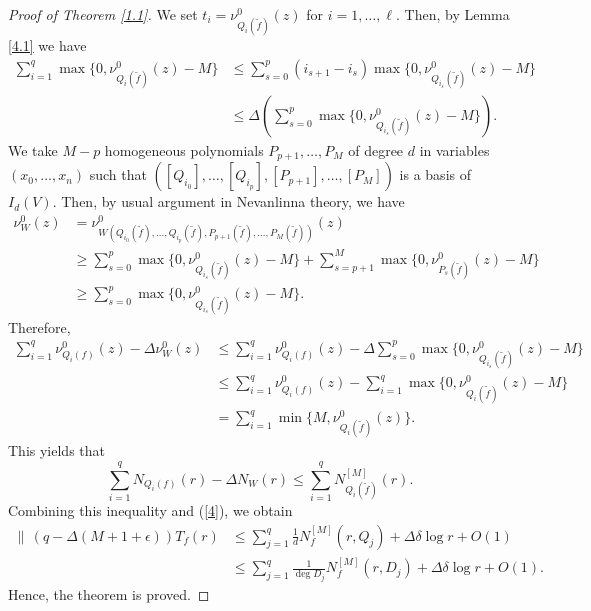 \documentclass[12pt]{amsart}
\begin{document}
\begin{proof}[Proof of Theorem \ref{1.1}]
We set $t_i=\nu^0_{Q_i(\tilde f)}(z)$ for $i=1,\ldots,\ell$. Then, by Lemma \ref{4.1} we have
\begin{align*}
\sum_{i=1}^q\max\{0,\nu^0_{Q_i(\tilde f)}(z)-M\}
&\le\sum_{s=0}^p(i_{s+1}-i_s)\max\{0,\nu^0_{Q_{i_s}(\tilde f)}(z)-M\}\\
&\le\Delta(\sum_{s=0}^p\max\{0,\nu^0_{Q_{i_s}(\tilde f)}(z)-M\}).
\end{align*}
We take $M-p$ homogeneous polynomials $P_{p+1},\ldots,P_M$ of degree $d$ in variables $(x_0,\ldots,x_n)$ such that $([Q_{i_0}],\ldots,[Q_{i_p}],[P_{p+1}],\ldots,[P_M])$ is a basis of $I_d(V)$. Then, by usual argument in Nevanlinna theory, we have
\begin{align*}
\nu^0_W(z)&=\nu^0_{W(Q_{i_0}(\tilde f),\ldots,Q_{i_p}(\tilde f),P_{p+1}(\tilde f),\ldots, P_M(\tilde f))}(z)\\
&\ge\sum_{s=0}^p\max\{0,\nu^0_{Q_{i_s}(\tilde f)}(z)-M\}+\sum_{s=p+1}^M\max\{0,\nu^0_{P_s(\tilde f)}(z)-M\}\\
&\ge\sum_{s=0}^p\max\{0,\nu^0_{Q_{i_s}(\tilde f)}(z)-M\}.
\end{align*}
Therefore,
\begin{align*}
\sum_{i=1}^q\nu^0_{Q_i(f)}(z)-\Delta \nu^0_{W}(z)&\le \sum_{i=1}^q\nu^0_{Q_i(f)}(z)-\Delta\sum_{s=0}^p\max\{0,\nu^0_{Q_{i_s}(\tilde f)}(z)-M\}\\
&\le \sum_{i=1}^q\nu^0_{Q_i(f)}(z)-\sum_{i=1}^q\max\{0,\nu^0_{Q_i(\tilde f)}(z)-M\}\\
&=\sum_{i=1}^q\min\{M,\nu^0_{Q_i(\tilde f)}(z)\}.
\end{align*}
This yields that
 $$\sum_{i=1}^qN_{Q_i(f)}(r)-\Delta N_{W}(r)\le \sum_{i=1}^qN^{[M]}_{Q_i(\tilde f)}(r).$$
Combining this inequality and (\ref{4}), we obtain
\begin{align*}
\|\,(q-\Delta(M+1+\epsilon))T_f(r)&\le\sum_{j=1}^q\frac{1}{ d}N^{[M]}_f(r,Q_j)+\Delta\delta \log r + O(1)\\
&\le\sum_{j=1}^q\frac{1}{\deg D_j}N^{[M]}_f(r,D_j)+\Delta\delta \log r + O(1).
\end{align*}
Hence, the theorem is proved.
\end{proof}
\end{document}
